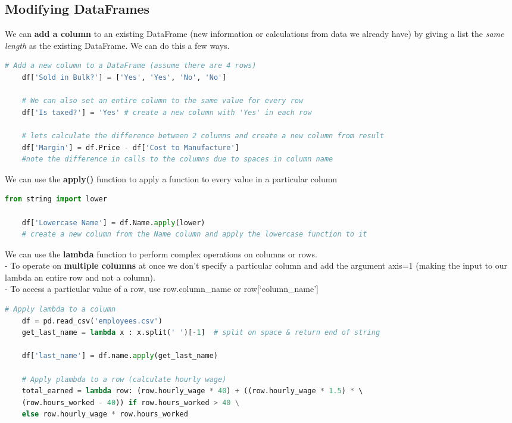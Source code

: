 \documentclass[11pt, a4paper]{article}
\begin{document}
\begin{spacing}{1.1}
	\subsection{Modifying DataFrames}
	We can \textbf{add a column} to an existing DataFrame (new information or calculations from data we already have) by giving a list the \textit{same length} as the existing DataFrame. We can do this a few ways.
	\begin{lstlisting}[language=Python]
	# Add a new column to a DataFrame (assume there are 4 rows)
	df['Sold in Bulk?'] = ['Yes', 'Yes', 'No', 'No']
	
	# We can also set an entire column to the same value for every row
	df['Is taxed?'] = 'Yes' # create a new column with 'Yes' in each row
	
	# lets calculate the difference between 2 columns and create a new column from result
	df['Margin'] = df.Price - df['Cost to Manufacture'] 
	#note the difference in calls to the columns due to spaces in column name \end{lstlisting} \newpage
	\noindent We can use the \textbf{apply()} function to apply a function to every value in a particular column
	\begin{lstlisting}[language=Python]
	from string import lower
	
	df['Lowercase Name'] = df.Name.apply(lower)
	# create a new column from the Name column and apply the lowercase function to it \end{lstlisting}\vspace*{1mm}
	We can use the \textbf{lambda} function to perform complex operations on columns or rows. \\
	\hspace*{4mm} - To operate on \textbf{multiple columns} at once we don't specify a particular column and add the argument \hspace*{7mm} axis=1 (making the input to our lambda an entire row and not a column). \\
	\hspace*{4mm} - To access a particular value of a row, use row.column\_name or row[`column\_name']
	\begin{lstlisting}[language=Python]
	# Apply lambda to a column
	df = pd.read_csv('employees.csv')
	get_last_name = lambda x : x.split(' ')[-1]  # split on space & return end of string
	
	df['last_name'] = df.name.apply(get_last_name)
	
	# Apply plambda to a row (calculate hourly wage)
	total_earned = lambda row: (row.hourly_wage * 40) + ((row.hourly_wage * 1.5) * \ 
	(row.hours_worked - 40)) if row.hours_worked > 40 \
	else row.hourly_wage * row.hours_worked
	

\end{lstlisting}
\end{spacing}
\end{document}
